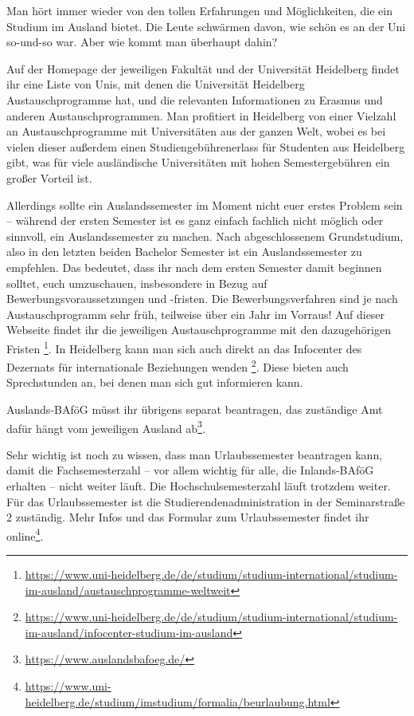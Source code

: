  
Man hört immer wieder von den tollen Erfahrungen und Möglichkeiten, die ein Studium im Ausland bietet. Die Leute schwärmen davon, wie schön es an der Uni so-und-so war. Aber wie kommt man überhaupt dahin? 

Auf der Homepage der jeweiligen Fakultät und der Universität Heidelberg findet ihr eine Liste von Unis, mit denen die Universität Heidelberg Austauschprogramme hat, und die relevanten Informationen zu Erasmus und anderen Austauschprogrammen. Man profitiert in Heidelberg von einer Vielzahl an Austauschprogramme mit Universitäten aus der ganzen Welt, wobei es bei vielen dieser außerdem einen Studiengebührenerlass für Studenten aus Heidelberg gibt, was für viele ausländische Universitäten mit hohen Semestergebühren ein großer Vorteil ist. 

Allerdings sollte ein Auslandssemester im Moment nicht euer erstes Problem sein -- während der ersten Semester ist es ganz einfach fachlich nicht möglich oder sinnvoll, ein Auslandssemester zu machen. Nach abgeschlossenem Grundstudium, also in den letzten beiden Bachelor Semester ist ein Auslandssemester zu empfehlen. Das bedeutet, dass ihr nach dem ersten Semester damit beginnen solltet, euch umzuschauen, insbesondere in Bezug auf Bewerbungsvoraussetzungen und -fristen. Die Bewerbungsverfahren sind je nach Austauschprogramm sehr früh, teilweise über ein Jahr im Vorraus! Auf dieser Webseite findet ihr die jeweiligen Austauschprogramme mit den dazugehörigen Fristen \footnote{\url{https://www.uni-heidelberg.de/de/studium/studium-international/studium-im-ausland/austauschprogramme-weltweit}}.
In Heidelberg kann man sich auch direkt an das Infocenter des Dezernats für internationale Beziehungen wenden \footnote{\url{https://www.uni-heidelberg.de/de/studium/studium-international/studium-im-ausland/infocenter-studium-im-ausland}}. Diese bieten auch Sprechstunden an, bei denen man sich gut informieren kann.

Auslands-BAföG müsst ihr übrigens separat beantragen, das zu\-stän\-dige Amt dafür hängt vom jeweiligen Ausland ab\footnote{\url{https://www.auslandsbafoeg.de/}}. 

Sehr wichtig ist noch zu wissen, dass man Urlaubssemester beantragen kann, damit die Fachsemesterzahl -- vor allem wichtig für alle, die Inlands-BAföG erhalten -- nicht weiter läuft. Die Hochschulsemesterzahl läuft trotzdem weiter. Für das Urlaubssemester ist die Studierendenadministration in der Seminarstraße 2 zuständig. Mehr Infos und das Formular zum Urlaubssemester findet ihr online\footnote{\url{https://www.uni-heidelberg.de/studium/imstudium/formalia/beurlaubung.html}}. 

